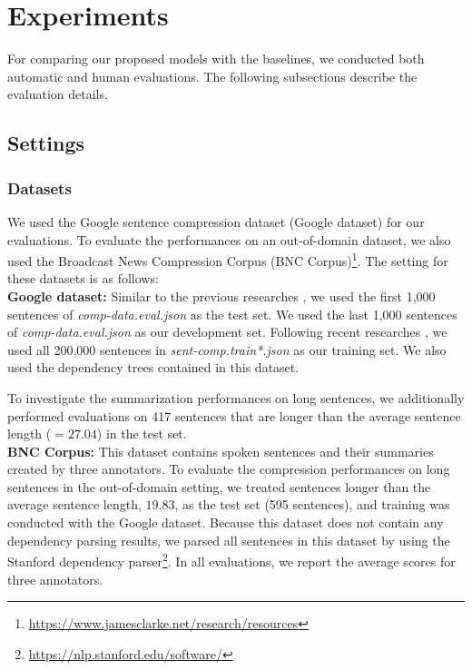 \documentclass[letterpaper]{article} \usepackage{aaai20}  \usepackage{times}  \usepackage{helvet} \usepackage{courier}  \usepackage[hyphens]{url}  \usepackage{graphicx} \urlstyle{rm} \def\UrlFont{\rm}  \usepackage{graphicx}  \frenchspacing  \setlength{\pdfpagewidth}{8.5in}  \setlength{\pdfpageheight}{11in}  \usepackage{tabu}
\begin{document}
\section{Experiments}
For comparing our proposed models with the baselines, we conducted both automatic and human evaluations. The following subsections describe the evaluation details.
\subsection{Settings}
\subsubsection{Datasets}

We used the Google sentence compression dataset (Google dataset) \cite{filippova-altun:2013:EMNLP} for our evaluations. To evaluate the performances on an out-of-domain dataset, we also used the Broadcast News Compression Corpus (BNC Corpus)\footnote{\url{https://www.jamesclarke.net/research/resources}}.
The setting for these datasets is as follows:\\
{\bf Google dataset:} Similar to the previous researches \cite{filippova-EtAl:2015:EMNLP,Tran:2016:EAN:3011077.3011111,wang-EtAl:2017:Long4,kamigaito-etal-2018-higher,zhao-etal-2018-language}, we used the first 1,000 sentences of {\sl comp-data.eval.json} as the test set.
We used the last 1,000 sentences of {\sl comp-data.eval.json} as our development set.
Following recent researches \cite{kamigaito-etal-2018-higher,zhao-etal-2018-language}, we used all 200,000 sentences in {\sl sent-comp.train*.json} as our training set.
We also used the dependency trees contained in this dataset.

To investigate the summarization performances on long sentences, we additionally performed evaluations on 417 sentences that are longer than the average sentence length ($=27.04$) in the test set.\\
{\bf BNC Corpus:} This dataset contains spoken sentences and their summaries created by three annotators. 
To evaluate the compression performances on long sentences in the out-of-domain setting, we treated sentences longer than the average sentence length, $19.83$, as the test set (595 sentences), and training was conducted with the Google dataset.
Because this dataset does not contain any dependency parsing results, we parsed all sentences in this dataset by using the Stanford dependency parser\footnote{\url{https://nlp.stanford.edu/software/}}.
In all evaluations, we report the average scores for three annotators.
\end{document}

